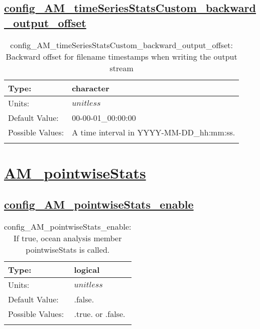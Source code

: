 \subsection[config\_AM\_timeSeriesStatsCustom\_backward\_output\_offset]{\hyperref[sec:nm_tab_AM_timeSeriesStatsCustom]{config\_AM\_timeSeriesStatsCustom\_backward\_output\_offset}}
\label{subsec:nm_sec_config_AM_timeSeriesStatsCustom_backward_output_offset}
\begin{center}
\begin{longtable}{| p{2.0in} || p{4.0in} |}
    \hline
    Type: & character \\
    \hline
    Units: & $unitless$ \\
    \hline
    Default Value: & 00-00-01\_00:00:00 \\
    \hline
    Possible Values: & A time interval in YYYY-MM-DD\_hh:mm:ss. \\
    \hline
    \caption{config\_AM\_timeSeriesStatsCustom\_backward\_output\_offset: Backward offset for filename timestamps when writing the output stream}
\end{longtable}
\end{center}
\section[AM\_pointwiseStats]{\hyperref[sec:nm_tab_AM_pointwiseStats]{AM\_pointwiseStats}}
\label{sec:nm_sec_AM_pointwiseStats}
\subsection[config\_AM\_pointwiseStats\_enable]{\hyperref[sec:nm_tab_AM_pointwiseStats]{config\_AM\_pointwiseStats\_enable}}
\label{subsec:nm_sec_config_AM_pointwiseStats_enable}
\begin{center}
\begin{longtable}{| p{2.0in} || p{4.0in} |}
    \hline
    Type: & logical \\
    \hline
    Units: & $unitless$ \\
    \hline
    Default Value: & .false. \\
    \hline
    Possible Values: & .true. or .false. \\
    \hline
    \caption{config\_AM\_pointwiseStats\_enable: If true, ocean analysis member pointwiseStats is called.}
\end{longtable}
\end{center}
